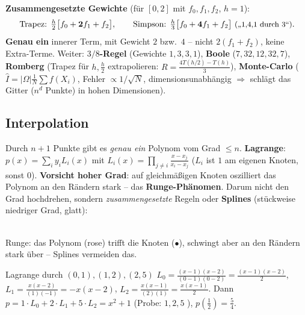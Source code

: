 \documentclass[a4paper,11pt]{article}
\begin{document}
\textbf{Zusammengesetzte Gewichte} (für $[0,2]$ mit $f_0,f_1,f_2$, $h=1$):
\[
  \text{Trapez: } \tfrac h2\bigl[f_0+\mathbf2 f_1+f_2\bigr],\qquad
  \text{Simpson: } \tfrac h3\bigl[f_0+\mathbf4 f_1+f_2\bigr]\ \text{\small(„1,4,1 durch 3``)}.
\]
\textbf{Genau ein} innerer Term, mit Gewicht $2$ bzw.\ $4$ -- nicht $2(f_1{+}f_2)$, keine Extra-Terme.
Weiter: \textbf{$3/8$-Regel} (Gewichte $1,3,3,1$), \textbf{Boole} ($7,32,12,32,7$),
\textbf{Romberg} (Trapez für $h,\tfrac h2$ extrapolieren: $R=\frac{4T(h/2)-T(h)}{3}$),
\textbf{Monte-Carlo} ($\hat I=|\Omega|\frac1N\sum f(X_i)$, Fehler $\propto 1/\sqrt N$, dimensions\-unabhängig
$\Rightarrow$ schlägt das Gitter ($n^d$ Punkte) in hohen Dimensionen).

\subsection{Interpolation}
Durch $n{+}1$ Punkte gibt es \emph{genau ein} Polynom vom Grad $\le n$. \textbf{Lagrange}:
$p(x)=\sum_i y_i L_i(x)$ mit $L_i(x)=\prod_{j\neq i}\frac{x-x_j}{x_i-x_j}$ ($L_i$ ist $1$ am eigenen
Knoten, sonst $0$). \textbf{Vorsicht hoher Grad}: auf gleichmäßigen Knoten oszilliert das Polynom an
den Rändern stark -- das \textbf{Runge-Phänomen}. Darum nicht den Grad hochdrehen, sondern
\emph{zusammengesetzte} Regeln oder \textbf{Splines} (stückweise niedriger Grad, glatt):

\begin{center}
\\[-2pt]
{\footnotesize\color{muted}Runge: das Polynom (rose) trifft die Knoten ($\bullet$), schwingt aber an den Rändern stark über -- Splines vermeiden das.}
\end{center}

\begin{rechnung}{Lagrange durch $(0,1),(1,2),(2,5)$}
$L_0=\frac{(x-1)(x-2)}{(0-1)(0-2)}=\frac{(x-1)(x-2)}2$,\;
$L_1=\frac{x(x-2)}{(1)(-1)}=-x(x-2)$,\;
$L_2=\frac{x(x-1)}{(2)(1)}=\frac{x(x-1)}2$. Dann
$p=1\!\cdot\!L_0+2\!\cdot\!L_1+5\!\cdot\!L_2=x^2+1$ (Probe: $1,2,5$ \checkmark), $p(\tfrac12)=\tfrac54$.
\end{rechnung}
\end{document}

